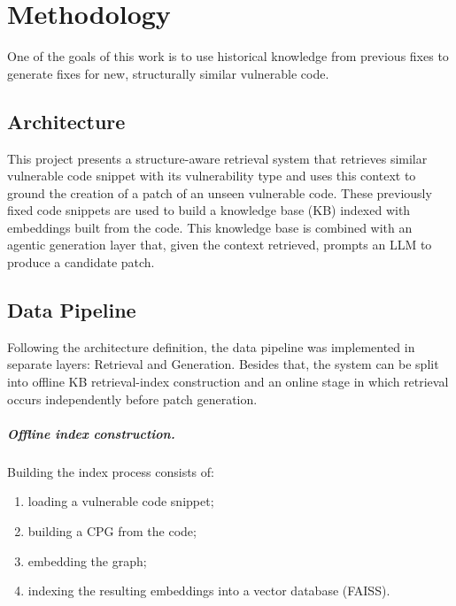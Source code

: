 \chapter{Methodology}\label{chapter:methodology}

One of the goals of this work is to use historical knowledge from previous fixes to generate fixes for new, structurally similar vulnerable code.

\section{Architecture}
This project presents a structure-aware retrieval system that retrieves similar vulnerable code snippet with its vulnerability type and uses this context to ground the creation of a patch of an unseen vulnerable code. 
These previously fixed code snippets are used to build a knowledge base (KB) indexed with embeddings built from the code. This knowledge base is combined with an agentic generation layer that, given the context retrieved, prompts an LLM to produce a candidate patch.

\section{Data Pipeline}

Following the architecture definition, the data pipeline was implemented in separate layers: Retrieval and Generation.
Besides that, the system can be split into offline KB retrieval-index construction and an online stage in which retrieval occurs independently before patch generation.

\paragraph{Offline index construction.}Building the index process consists of:

\begin{enumerate}
  \item loading a vulnerable code snippet; 
  \item building a CPG from the code;
  \item embedding the graph;
  \item indexing the resulting embeddings into a vector database (FAISS).
\end{enumerate}

